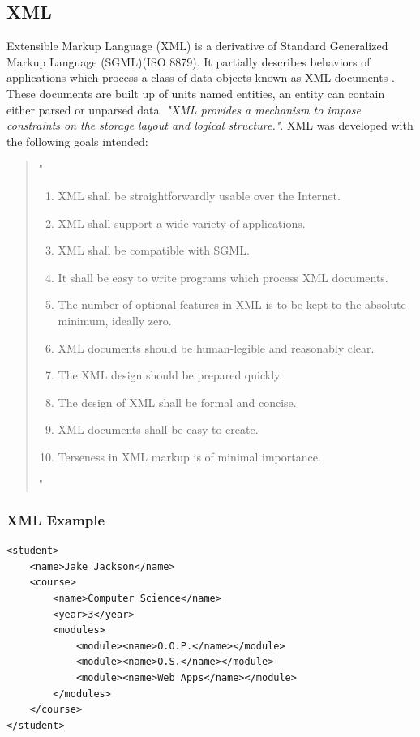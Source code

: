 \subsection{XML}
	Extensible Markup Language (XML) is a derivative of Standard Generalized Markup Language (SGML)(ISO 8879). It partially describes behaviors of applications which process a class of data objects known as XML documents \cite{w3c}. These documents are built up of units named entities, an entity can contain either parsed or unparsed data. \emph{"XML provides a mechanism to impose constraints on the storage layout and logical structure."}\cite{w3c}. XML was developed with the following goals intended:
\begin{quotation}"
\begin{enumerate}
 \item XML shall be straightforwardly usable over the Internet.
	\item XML shall support a wide variety of applications.
	\item XML shall be compatible with SGML.
	\item It shall be easy to write programs which process XML documents.
	\item The number of optional features in XML is to be kept to the absolute minimum, ideally zero.
	\item XML documents should be human-legible and reasonably clear.
	\item The XML design should be prepared quickly.
	\item The design of XML shall be formal and concise.
	\item XML documents shall be easy to create.
	\item Terseness in XML markup is of minimal importance.
    \end{enumerate}"\cite{w3c}
\end{quotation}

\subsubsection{XML Example}
\begin{verbatim}
<student>
	<name>Jake Jackson</name>
	<course>
		<name>Computer Science</name>
		<year>3</year>
		<modules>
			<module><name>O.O.P.</name></module>
			<module><name>O.S.</name></module>
			<module><name>Web Apps</name></module>
		</modules>
	</course>
</student>
\end{verbatim}

